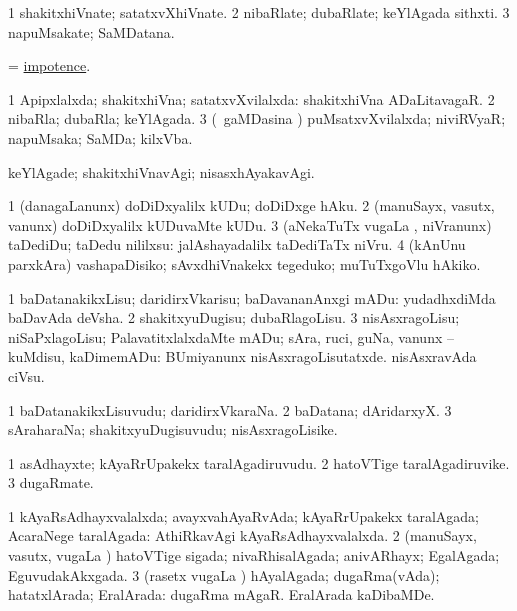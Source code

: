 \bentry
{}
\gl{\nA}
\bmng
\bnum
\num{1} shakitxhiVnate; satatxvXhiVnate. 
\num{2} nibaRlate; dubaRlate; keYlAgada sithxti. 
\num{3} napuMsakate; SaMDatana. 
\enum
\emng
\eentry

\bentry
{}
\gl{\nA}
\bmng
 = \hyperlink{impotence}{impotence}. 
\emng
\eentry

\bentry
{}
\gl{\gu}
\bmng
\bnum
\num{1} Apipxlalxda; shakitxhiVna; satatxvXvilalxda:  shakitxhiVna ADaLitavagaR. 
\num{2} nibaRla; dubaRla; keYlAgada. 
\num{3} (\kanmu\ gaMDasina \vi) puMsatxvXvilalxda; niviRVyaR; napuMsaka; SaMDa; kilxVba. 
\enum
\emng
\eentry

\bentry
{}
\gl{\kirxvi}
\bmng
keYlAgade; shakitxhiVnavAgi; nisasxhAyakavAgi. 
\emng
\eentry

\bentry
{}
\gl{\sakirx}
\bmng
\bnum
\num{1} (danagaLanunx) doDiDxyalilx kUDu; doDiDxge hAku. 
\num{2} (manuSayx, vasutx, \mo vanunx) doDiDxyalilx kUDuvaMte kUDu. 
\num{3} (aNekaTuTx \mo vugaLa \vi, niVranunx) taDediDu; taDedu nililxsu:  jalAshayadalilx taDediTaTx niVru. 
\num{4} (kAnUnu parxkAra) vashapaDisiko; sAvxdhiVnakekx tegeduko; muTuTxgoVlu hAkiko. 
\enum
\emng
\eentry

\bentry
{}
\gl{\sakirx}
\bmng
\bnum
\num{1} baDatanakikxLisu; daridirxVkarisu; baDavananAnxgi mADu:  yudadhxdiMda baDavAda deVsha. 
\num{2} shakitxyuDugisu; dubaRlagoLisu. 
\num{3} nisAsxragoLisu; niSaPxlagoLisu; PalavatitxlalxdaMte mADu; sAra, ruci, guNa, \mo vanunx -- kuMdisu, kaDimemADu:  BUmiyanunx nisAsxragoLisutatxde.  nisAsxravAda ciVsu. 
\enum
\emng
\eentry

\bentry
{}
\gl{\nA}
\bmng
\bnum
\num{1} baDatanakikxLisuvudu; daridirxVkaraNa. 
\num{2} baDatana; dAridarxyX. 
\num{3} sAraharaNa; shakitxyuDugisuvudu; nisAsxragoLisike. 
\enum
\emng
\eentry

\bentry
{}
\gl{\nA}
\bmng
\bnum
\num{1} asAdhayxte; kAyaRrUpakekx taralAgadiruvudu. 
\num{2} hatoVTige taralAgadiruvike. 
\num{3} dugaRmate. 
\enum
\emng
\eentry

\bentry
{}
\gl{\gu}
\bmng
\bnum
\num{1} kAyaRsAdhayxvalalxda; avayxvahAyaRvAda; kAyaRrUpakekx taralAgada; AcaraNege taralAgada:  AthiRkavAgi kAyaRsAdhayxvalalxda. 
\num{2} (manuSayx, vasutx, \mo vugaLa \vi) hatoVTige sigada; nivaRhisalAgada; anivARhayx; EgalAgada; EguvudakAkxgada. 
\num{3} (rasetx \mo vugaLa \vi) hAyalAgada; dugaRma(vAda); hatatxlArada; EralArada:  dugaRma mAgaR.  EralArada kaDibaMDe. 
\enum
\emng
\eentry

